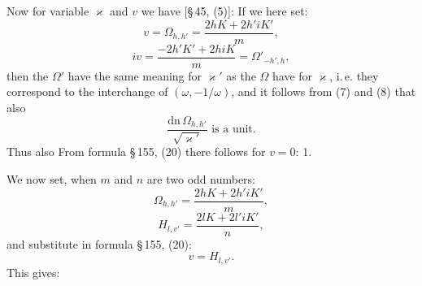 
Now for variable $\varkappa$ and $v$ we have [\S\,45, (5)]:
If we here set:
\[
v = \Omega_{h,h'} = \dfrac{2hK + 2h'iK'}{m},
\]
\[
iv = \dfrac{-2h'K' + 2hiK}{m} = \Omega'_{-h',h},
\]
then the $\Omega'$ have the same meaning for $\varkappa'$ as the $\Omega$ have for $\varkappa$, i.\,e. they correspond to the interchange of $(\omega, -1/\omega)$, and it follows from (7) and (8) that also
\[
\dfrac{\mathrm{dn}\,\Omega_{h,h'}}{\sqrt{\varkappa'}} \text{ is a unit.}
\]
Thus also
From formula \S\,155, (20) there follows for $v=0$:
1. 

We now set, when $m$ and $n$ are two odd numbers:
\[
\Omega_{h,h'} = \dfrac{2hK + 2h'iK'}{m},
\]
\[
H_{l,v'} = \dfrac{2lK + 2l'iK'}{n}, %
\]
and substitute in formula \S\,155, (20):
\[
v = H_{l,v'}.
\]
This gives:
